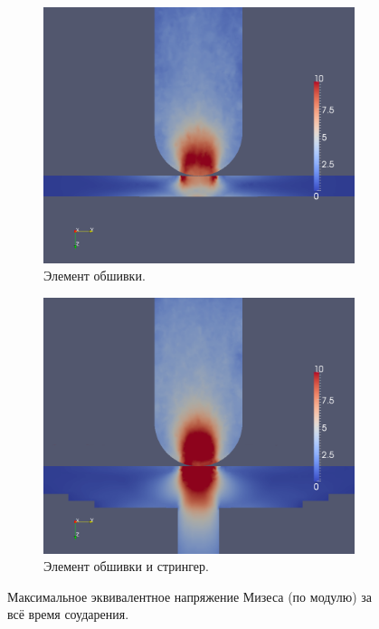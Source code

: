 \begin{figure}[h]
\begin{subfigure}[b]{0.5\textwidth}
\centering
\includegraphics[width=\textwidth]{png/pkm-experiment/wing-only/mises.png}
\caption{Элемент обшивки.}
\end{subfigure}
\begin{subfigure}[b]{0.5\textwidth}
\centering
\includegraphics[width=\textwidth]{png/pkm-experiment/wing-stringer/mises.png}
\caption{Элемент обшивки и стрингер.}
\end{subfigure}
\caption{Максимальное эквивалентное напряжение Мизеса (по модулю) за всё время соударения.}
\label{pic:pkm_experiment_mises}
\end{figure}

